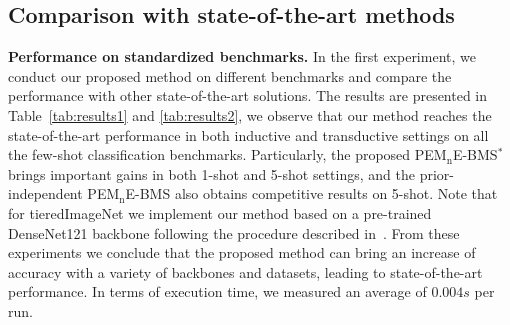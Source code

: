 \documentclass[review]{elsarticle}
\begin{document}
\subsection{Comparison with state-of-the-art methods}
\textbf{Performance on standardized benchmarks.} In the first experiment, we conduct our proposed method on different benchmarks and compare the performance with other state-of-the-art solutions. The results are presented in Table~\ref{tab:results1} and \ref{tab:results2}, we observe that our method reaches the state-of-the-art performance in both inductive and transductive settings on all the few-shot classification benchmarks. Particularly, the proposed PE$\mathrm{M_n}$E-BMS$^*$ brings important gains in both 1-shot and 5-shot settings, and the prior-independent PE$\mathrm{M_n}$E-BMS also obtains competitive results on 5-shot. Note that for tieredImageNet we implement our method based on a pre-trained DenseNet121 backbone following the procedure described in~\cite{DBLP:journals/corr/abs-1911-04623}. From these experiments we conclude that the proposed method can bring an increase of accuracy with a variety of backbones and datasets, leading to state-of-the-art performance. In terms of execution time, we measured an average of $0.004s$ per run.
\end{document}
